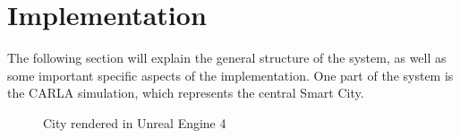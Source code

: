 \section{Implementation} \label{6sec:impl}

The following section will explain the general structure of the system,
as well as some important specific aspects of the implementation.
One part of the system is the CARLA simulation,
which represents the central Smart City.


\begin{figure}
    \vspace{-0pt}
    \vspace{-10pt}
  \caption{City rendered in Unreal Engine 4}
  \label{6fig:cityRender}
    \vspace{-10pt}
\end{figure}

